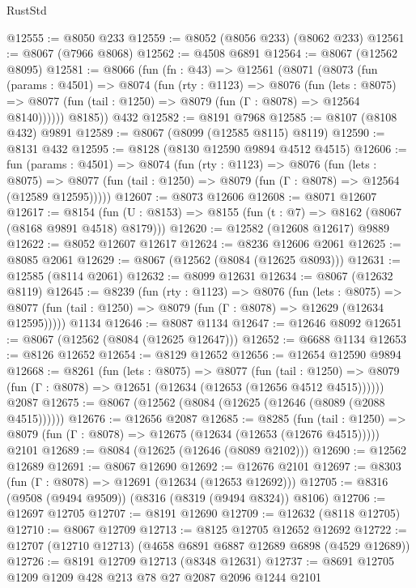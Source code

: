 \begin{lexlean}{RustStd}
\begin{coremodule}
@12555 := @8050 @233
@12559 := @8052 (@8056 @233) (@8062 @233)
@12561 := @8067 (@7966 @8068)
@12562 := @4508 @6891
@12564 := @8067 (@12562 @8095)
@12581 := @8066
    (fun (fn : @43) =>
    @12561
      (@8071
        (@8073
          (fun (params : @4501) =>
          @8074
            (fun (rty : @1123) =>
            @8076
              (fun (lets : @8075) =>
              @8077 (fun (tail : @1250) => @8079 (fun (Γ : @8078) => @12564 @8140))))))
        @8185))
    @432
@12582 := @8191 @7968
@12585 := @8107 (@8108 @432) @9891
@12589 := @8067 (@8099 (@12585 @8115) @8119)
@12590 := @8131 @432
@12595 := @8128 (@8130 @12590 @9894 @4512 @4515)
@12606 := fun (params : @4501) =>
  @8074
    (fun (rty : @1123) =>
    @8076
      (fun (lets : @8075) =>
      @8077 (fun (tail : @1250) => @8079 (fun (Γ : @8078) => @12564 (@12589 @12595)))))
@12607 := @8073 @12606
@12608 := @8071 @12607
@12617 := @8154 (fun (U : @8153) => @8155 (fun (t : @7) => @8162 (@8067 (@8168 @9891 @4518) @8179)))
@12620 := @12582 (@12608 @12617) @9889
@12622 := @8052 @12607 @12617
@12624 := @8236 @12606 @2061
@12625 := @8085 @2061
@12629 := @8067 (@12562 (@8084 (@12625 @8093)))
@12631 := @12585 (@8114 @2061)
@12632 := @8099 @12631
@12634 := @8067 (@12632 @8119)
@12645 := @8239
    (fun (rty : @1123) =>
    @8076
      (fun (lets : @8075) =>
      @8077 (fun (tail : @1250) => @8079 (fun (Γ : @8078) => @12629 (@12634 @12595)))))
    @1134
@12646 := @8087 @1134
@12647 := @12646 @8092
@12651 := @8067 (@12562 (@8084 (@12625 @12647)))
@12652 := @6688 @1134
@12653 := @8126 @12652
@12654 := @8129 @12652
@12656 := @12654 @12590 @9894
@12668 := @8261
    (fun (lets : @8075) =>
    @8077
      (fun (tail : @1250) =>
      @8079 (fun (Γ : @8078) => @12651 (@12634 (@12653 (@12656 @4512 @4515))))))
    @2087
@12675 := @8067 (@12562 (@8084 (@12625 (@12646 (@8089 (@2088 @4515))))))
@12676 := @12656 @2087
@12685 := @8285
    (fun (tail : @1250) => @8079 (fun (Γ : @8078) => @12675 (@12634 (@12653 (@12676 @4515)))))
    @2101
@12689 := @8084 (@12625 (@12646 (@8089 @2102)))
@12690 := @12562 @12689
@12691 := @8067 @12690
@12692 := @12676 @2101
@12697 := @8303 (fun (Γ : @8078) => @12691 (@12634 (@12653 @12692)))
@12705 := @8316 (@9508 (@9494 @9509)) (@8316 (@8319 (@9494 @8324)) @8106)
@12706 := @12697 @12705
@12707 := @8191 @12690
@12709 := @12632 (@8118 @12705)
@12710 := @8067 @12709
@12713 := @8125 @12705 @12652 @12692
@12722 := @12707 (@12710 @12713) (@4658 @6891 @6887 @12689 @6898 (@4529 @12689))
@12726 := @8191 @12709 @12713 (@8348 @12631)
@12737 := @8691 @12705 @1209 @1209 @428 @213 @78 @27 @2087 @2096 @1244 @2101

\end{coremodule}
\end{lexlean}
